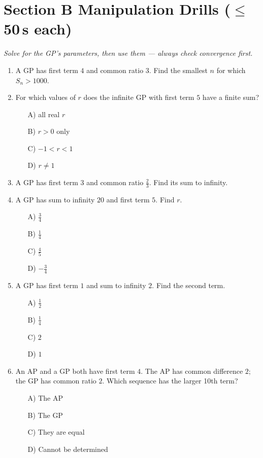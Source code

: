 \documentclass[11pt,a4paper]{article}
\begin{document}
\section*{Section B \quad Manipulation Drills \hfill{\normalfont\small($\leq$50\,s each)}}

\noindent\textit{Solve for the GP's parameters, then use them --- always check convergence first.}

\begin{enumerate}

\item A GP has first term $4$ and common ratio $3$. Find the smallest $n$ for which $S_n>1000$.

\item For which values of $r$ does the infinite GP with first term $5$ have a finite sum?
\begin{itemize}
\item[A)] all real $r$
\item[B)] $r>0$ only
\item[C)] $-1<r<1$
\item[D)] $r\neq1$
\end{itemize}

\item A GP has first term $3$ and common ratio $\tfrac23$. Find its sum to infinity.

\item A GP has sum to infinity $20$ and first term $5$. Find $r$.
\begin{itemize}
\item[A)] $\tfrac34$
\item[B)] $\tfrac14$
\item[C)] $\tfrac45$
\item[D)] $-\tfrac34$
\end{itemize}

\item A GP has first term $1$ and sum to infinity $2$. Find the second term.
\begin{itemize}
\item[A)] $\tfrac12$
\item[B)] $\tfrac14$
\item[C)] $2$
\item[D)] $1$
\end{itemize}

\item An AP and a GP both have first term $4$. The AP has common difference $2$; the GP has common ratio $2$. Which sequence has the larger 10th term?
\begin{itemize}
\item[A)] The AP
\item[B)] The GP
\item[C)] They are equal
\item[D)] Cannot be determined
\end{itemize}


\end{enumerate}
\end{document}
